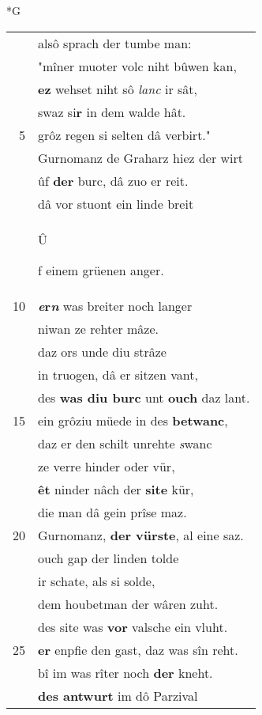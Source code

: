 \documentclass[8pt,a4paper,notitlepage]{article}
\begin{document}
\begin{table}[ht]
\begin{minipage}[t]{0.5\linewidth}
\small
\begin{center}*G
\end{center}
\begin{tabular}{rl}
 & alsô sprach der tumbe man:\\ 
 & "mîner muoter volc niht bûwen kan,\\ 
 & \textbf{ez} wehset niht sô \textit{lanc} ir sât,\\ 
 & swaz si\textbf{r} in dem walde hât.\\ 
5 & grôz regen si selten dâ verbirt."\\ 
 & Gurnomanz de Graharz hiez der wirt\\ 
 & ûf \textbf{der} burc, dâ zuo er reit.\\ 
 & dâ vor stuont ein linde breit\\ 
 & \begin{large}Û\end{large}f einem grüenen anger.\\ 
10 & \textbf{\textit{e}r}\textit{\textbf{n}} was breiter noch langer\\ 
 & niwan ze rehter mâze.\\ 
 & daz ors unde diu strâze\\ 
 & in truogen, dâ er sitzen vant,\\ 
 & des \textbf{was diu burc} unt \textbf{ouch} daz lant.\\ 
15 & ein grôziu müede in des \textbf{betwanc},\\ 
 & daz er den schilt unrehte \textit{s}wanc\\ 
 & ze verre hinder oder vür,\\ 
 & \textbf{êt} ninder nâch der \textbf{site} kür,\\ 
 & die man dâ gein prîse maz.\\ 
20 & Gurnomanz, \textbf{der vürste}, al eine saz.\\ 
 & ouch gap der linden tolde\\ 
 & ir schate, als si solde,\\ 
 & dem houbetman der wâren zuht.\\ 
 & des site was \textbf{vor} valsche ein vluht.\\ 
25 & \textbf{er} enpfie den gast, daz was sîn reht.\\ 
 & bî im was rîter noch \textbf{der} kneht.\\ 
 & \textbf{des antwurt} im dô Parzival\\ 

\end{tabular}
\end{minipage}
\end{table}
\end{document}
